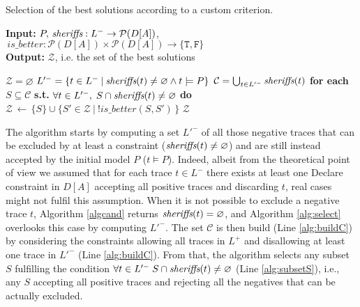 \begin{algorithm}
    \caption{Selection of the best solutions according to a custom criterion.}
    \label{alg:select}
    \textbf{Input:}  $P,\, \textit{sheriffs} : L^- \rightarrow \mathcal{P}({D[A]})$,$\,{is\_better}:\mathcal{P}({D[A]})\times\mathcal{P}({D[A]})\rightarrow \{\texttt{T},\texttt{F}\}$\\
    \textbf{Output:} $\mathcal{Z}$, i.e. the set of the best solutions
	\begin{algorithmic}[1] 
   	\State $\mathcal{Z}=\varnothing$
  	\State $ L'^- = \{t \in L^- \: | \: \textit{sheriffs}(t) \neq \varnothing \land t\models P\}$
	\State $\mathcal{C} = \bigcup_{t\in L'^-} \textit{sheriffs}(t)$\label{alg:buildC}
	\State \textbf{for each} $S \subseteq \mathcal{C}$ \textbf{s.t.} $\forall t \in L'^-, \; S\cap \textit{sheriffs}(t) \neq \varnothing$ \textbf{do} \label{alg:subsetS}
	\Indent
		 \label{alg:isbetter}
		\State $\mathcal{Z} \, \leftarrow\, \{S\} \cup \{ S'\in\mathcal{Z}\ |\ !is\_better(S,S')\,\}$ \label{alg:previousAreOk}
		\EndIf
	\EndIndent
	\State \Return $\mathcal{Z}$  
    \EndProcedure
    \end{algorithmic}
\end{algorithm}

The algorithm starts by computing a set $L'^-$ of all those negative traces that can be excluded by at least a constraint ($\textit{sheriffs}(t)\neq\varnothing$) and are still instead accepted by the initial model $P$ ($t\models P$). 
Indeed, albeit from the theoretical point of view we assumed that for each trace $t \in L^-$ there exists at least one Declare constraint in $D[A]$ accepting all positive traces and discarding $t$, real cases might not fulfil this assumption.%
When it is not possible to exclude a negative trace $t$, Algorithm \ref{algcand} returns $\textit{sheriffs}(t)=\varnothing$, and Algorithm \ref{alg:select} overlooks this case by computing $L'^-$. 
%
The set $\mathcal{C}$ is then build (Line \ref{alg:buildC}) by considering the constraints allowing all traces in $L^+$ and disallowing at least one trace in $L'^-$ (Line \ref{alg:buildC}). From that, the algorithm selects any subset $S$ fulfilling the condition $\forall t \in L'^- \; S\cap \textit{sheriffs}(t) \neq \varnothing$ (Line \ref{alg:subsetS}), i.e., any $S$ accepting all positive traces and rejecting all the negatives that can be actually excluded.

